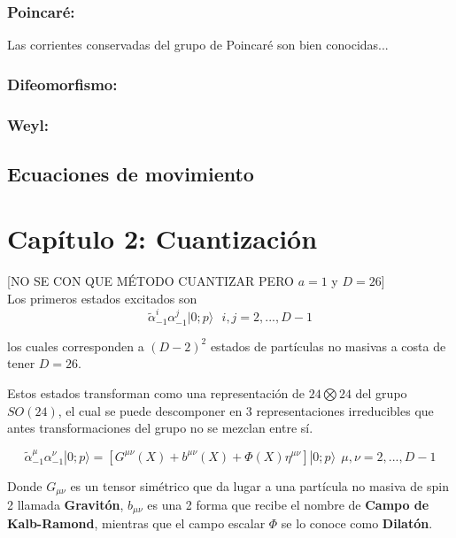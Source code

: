 \documentclass[]{article}
\begin{document}
\subsubsection*{Poincaré:}

Las corrientes conservadas del grupo de Poincaré son bien conocidas...

\subsubsection*{Difeomorfismo:}

\subsubsection*{Weyl:}






\subsection*{Ecuaciones de movimiento}


\section*{Capítulo 2: Cuantización}

[NO SE CON QUE MÉTODO CUANTIZAR PERO $ a=1 $ y $ D=26 $]\\

Los primeros estados excitados son 
\begin{equation}\label{key}
\tilde{\alpha}^{i}_{-1}\alpha^{j}_{-1}|0;p\rangle \ \ \ i,j=2,...,D-1
\end{equation}

\noindent los cuales corresponden a $ (D-2)^2 $ estados de partículas no masivas a costa de tener $ D=26 $.

Estos estados transforman como una representación de $ 24 \bigotimes 24 $ del grupo $ SO(24) $, el cual se puede descomponer en 3 representaciones irreducibles que antes transformaciones del grupo no se mezclan entre sí.

\begin{equation}\label{key}
\tilde{\alpha}^{\mu}_{-1}\alpha^{\nu}_{-1}|0;p\rangle= \left[G^{\mu \nu}(X) + b^{\mu \nu}(X) + \Phi(X)\eta^{\mu\nu}\right] |0;p\rangle \ \ \mu,\nu=2,...,D-1
\end{equation} 

Donde $ G_{\mu\nu} $ es un tensor simétrico que da lugar a una partícula no masiva de spin 2 llamada \textbf{Gravitón}, $ b_{\mu\nu} $ es una 2 forma que recibe el nombre de \textbf{Campo de Kalb-Ramond}, mientras que el campo escalar $ \Phi $ se lo conoce como \textbf{Dilatón}.
\end{document}
